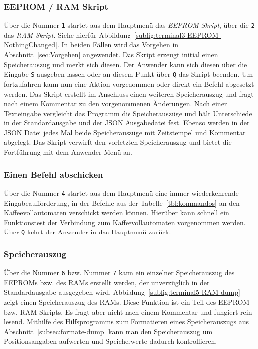 \subsubsection{EEPROM / RAM Skript}\label{subsubsec:EEPROM-RAM-Skript}
Über die Nummer \texttt{1} startet aus dem Hauptmenü das \textit{EEPROM Skript}, über die \texttt{2} das \textit{RAM Skript}.
Siehe hierfür Abbildung~\ref{subfig:terminal3-EEPROM-NothingChanged}.
In beiden Fällen wird das Vorgehen in Abschnitt~\ref{sec:Vorgehen} angewendet.
Das Skript erzeugt initial einen Speicherauszug und merkt sich diesen.
Der Anwender kann sich diesen über die Eingabe \texttt{S} ausgeben lassen oder an diesem Punkt über \texttt{Q} das Skript beenden.
Um fortzufahren kann nun eine Aktion vorgenommen oder direkt ein Befehl abgesetzt werden.
Das Skript erstellt im Anschluss einen weiteren Speicherauszug und fragt nach einem Kommentar zu den vorgenommenen Änderungen.
Nach einer Texteingabe vergleicht das Programm die Speicherauszüge und hält Unterschiede in der Standardausgabe und der \ac{JSON} Ausgabedatei fest.
Ebenso werden in der \ac{JSON} Datei jedes Mal beide Speicherauszüge mit Zeitstempel und Kommentar abgelegt.
Das Skript verwirft den vorletzten Speicherauszug und bietet die Fortführung mit dem Anwender Menü an.

\subsubsection{Einen Befehl abschicken}
Über die Nummer \texttt{4} startet aus dem Hauptmenü eine immer wiederkehrende Eingabeaufforderung, in der Befehle aus der Tabelle~\ref{tbl:kommandos} an den Kaffeevollautomaten verschickt werden können.
Hierüber kann schnell ein Funktionstest der Verbindung zum Kaffeevollautomaten vorgenommen werden.
Über \texttt{Q} kehrt der Anwender in das Hauptmenü zurück.

\subsubsection{Speicherauszug}
Über die Nummer \texttt{6} bzw. Nummer \texttt{7} kann ein einzelner Speicherauszug des \ac{EEPROM}s bzw. des \ac{RAM}s erstellt werden, der unverzüglich in der Standardausgabe ausgegeben wird.
Abbildung~\ref{subfig:terminal5-RAM-dump} zeigt einen Speicherauszug des \ac{RAM}s.
Diese Funktion ist ein Teil des \ac{EEPROM} bzw. \ac{RAM} Skripts.
Es fragt aber nicht nach einem Kommentar und fungiert rein lesend.
Mithilfe des Hilfsprogramms zum Formatieren eines Speicherauszugs aus Abschnitt~\ref{subsec:formate-dump} kann man den Speicherauszug um Positionsangaben aufwerten und Speicherwerte dadurch kontrollieren.

